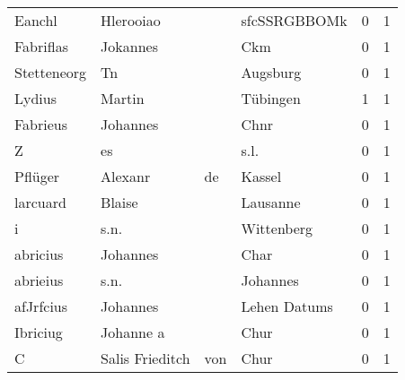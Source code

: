 \begin{center}
\begin{tiny}
\begin{longtabu}{llllrr}
                   Eanchl &                          Hlerooiao &             &                                sfcSSRGBBOMk &          0 &         1 \\
                Fabriflas &                           Jokannes &             &                                         Ckm &          0 &         1 \\
              Stetteneorg &                                 Tn &             &                                    Augsburg &          0 &         1 \\
                   Lydius &                             Martin &             &                                    Tübingen &          1 &         1 \\
                 Fabrieus &                           Johannes &             &                                        Chnr &          0 &         1 \\
                        Z &                                 es &             &                                        s.l. &          0 &         1 \\
                  Pflüger &                            Alexanr &          de &                                      Kassel &          0 &         1 \\
                 larcuard &                             Blaise &             &                                    Lausanne &          0 &         1 \\
                        i &                               s.n. &             &                                  Wittenberg &          0 &         1 \\
                 abricius &                           Johannes &             &                                        Char &          0 &         1 \\
                 abrieius &                               s.n. &             &                                    Johannes &          0 &         1 \\
                afJrfcius &                           Johannes &             &                                Lehen Datums &          0 &         1 \\
                 Ibriciug &                          Johanne a &             &                                        Chur &          0 &         1 \\
                        C &                    Salis Frieditch &         von &                                        Chur &          0 &         1 \\

\end{longtabu}
\end{tiny}
\end{center}
